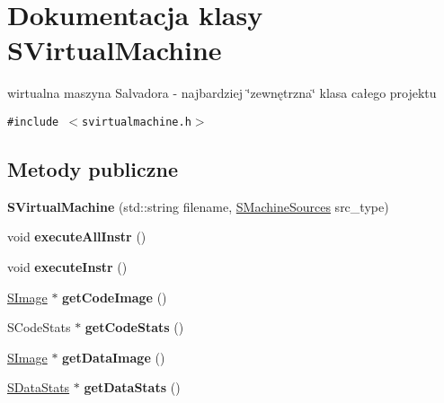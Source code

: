 \hypertarget{classSVirtualMachine}{
\section{Dokumentacja klasy SVirtualMachine}
\label{classSVirtualMachine}
}
wirtualna maszyna Salvadora - najbardziej \char`\"{}zewnętrzna\char`\"{} klasa całego projektu  


{\tt \#include $<$svirtualmachine.h$>$}

\subsection*{Metody publiczne}
\begin{CompactItemize}
\item 
\hypertarget{classSVirtualMachine_9aa8763ce9817a6f96152c9bb707b082}{
\textbf{SVirtualMachine} (std::string filename, \hyperlink{senums_8h_77022c8b228fdaa8e10b3843791b7b8c}{SMachineSources} src\_\-type)}
\label{classSVirtualMachine_9aa8763ce9817a6f96152c9bb707b082}

\item 
\hypertarget{classSVirtualMachine_f3874f10dac15f27b23dc4b976271413}{
void \textbf{executeAllInstr} ()}
\label{classSVirtualMachine_f3874f10dac15f27b23dc4b976271413}

\item 
\hypertarget{classSVirtualMachine_200c4aae4eedf52ba7a3754295505186}{
void \textbf{executeInstr} ()}
\label{classSVirtualMachine_200c4aae4eedf52ba7a3754295505186}

\item 
\hypertarget{classSVirtualMachine_468c60a939cdefc44129d0dcf44adb67}{
\hyperlink{classSImage}{SImage} $\ast$ \textbf{getCodeImage} ()}
\label{classSVirtualMachine_468c60a939cdefc44129d0dcf44adb67}

\item 
\hypertarget{classSVirtualMachine_3c9a0fef8891c18d087ff7c506a090b2}{
SCodeStats $\ast$ \textbf{getCodeStats} ()}
\label{classSVirtualMachine_3c9a0fef8891c18d087ff7c506a090b2}

\item 
\hypertarget{classSVirtualMachine_73da810ed568a89a2d1f4ed211efb7e7}{
\hyperlink{classSImage}{SImage} $\ast$ \textbf{getDataImage} ()}
\label{classSVirtualMachine_73da810ed568a89a2d1f4ed211efb7e7}

\item 
\hypertarget{classSVirtualMachine_dee2d626a3312a4b38b91f5b550b2663}{
\hyperlink{classSDataStats}{SDataStats} $\ast$ \textbf{getDataStats} ()}
\label{classSVirtualMachine_dee2d626a3312a4b38b91f5b550b2663}

\end{CompactItemize}


